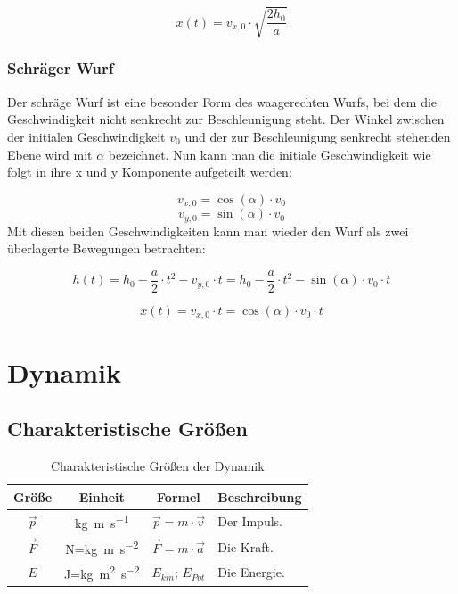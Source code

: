 \documentclass[a4paper]{article}
\begin{document}
				\begin{equation}
					x(t) = v_{x,0}\cdot\sqrt{\frac{2h_0}{a}}
				\end{equation}
				
			\subsubsection{Schräger Wurf}
				Der schräge Wurf ist eine besonder Form des waagerechten Wurfs, bei dem die Geschwindigkeit nicht senkrecht zur Beschleunigung steht. Der Winkel zwischen der initialen Geschwindigkeit $v_0$ und der zur Beschleunigung senkrecht stehenden Ebene wird mit $\alpha$ bezeichnet. Nun kann man die initiale Geschwindigkeit wie folgt in ihre x und y Komponente aufgeteilt werden:
				
				\begin{equation}
					v_{x,0} = \cos(\alpha)\cdot v_0
				\end{equation}
				\begin{equation}
					v_{y,0} = \sin(\alpha)\cdot v_0
				\end{equation}
				Mit diesen beiden Geschwindigkeiten kann man wieder den Wurf als zwei \"uberlagerte Bewegungen betrachten:
				
				\begin{equation}
					h(t) = h_0 - \frac{a}{2}\cdot t^2 - v_{y,0}\cdot t = h_0 - \frac{a}{2}\cdot t^2 - \sin(\alpha)\cdot v_0\cdot t
				\end{equation}
				
				\begin{equation}
					x(t) = v_{x,0}\cdot t = \cos(\alpha)\cdot v_0\cdot t
				\end{equation}
			
	\section{Dynamik}
		\subsection{Charakteristische Größen}
	
			\begin{table}[H]
				\def\arraystretch{1.5}
				\begin{tabularx}{\textwidth}{|c|c|c|X|}\hline
					Größe & Einheit & Formel & Beschreibung \\\hline
					$\vec{p}$ & \si{\kg\meter\per\second} & $\vec{p} = m\cdot \vec{v}$ & Der Impuls.\\\hline
					$\vec{F}$ & \si{\newton}=\si{\kg\meter\per\second\squared}  & $	\vec{F} = m\cdot \vec{a}$ & Die Kraft.\\\hline
					$E$ & \si{\joule}=\si{\kg\meter\squared\per\second\squared} &\hyperref[energie_kin]{$E_{kin}$}; \hyperref[energie_pot]{$E_{Pot}$}  & Die Energie.\\\hline
				\end{tabularx}
				\caption {Charakteristische Größen der Dynamik}
				\label{table:dynamik_grossen}
			\end{table}
	
\end{document}
